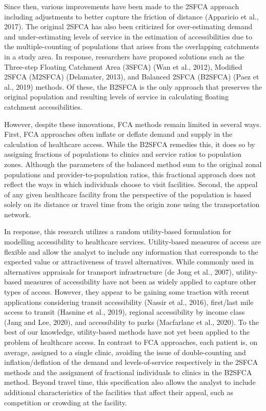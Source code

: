 \documentclass[]{elsarticle} %
\begin{document}
Since then, various improvements have been made to the 2SFCA approach
including adjustments to better capture the friction of distance
(Apparicio et al., 2017). The original 2SFCA has also been criticized
for over-estimating demand and under-estimating levels of service in the
estimation of accessibilities due to the multiple-counting of
populations that arises from the overlapping catchments in a study area.
In response, researchers have proposed solutions such as the Three-step
Floating Catchment Area (3SFCA) (Wan et al., 2012), Modified 2SFCA
(M2SFCA) (Delamater, 2013), and Balanced 2SFCA (B2SFCA) (Paez et al.,
2019) methods. Of these, the B2SFCA is the only approach that preserves
the original population and resulting levels of service in calculating
floating catchment accessibilities.

However, despite these innovations, FCA methods remain limited in
several ways. First, FCA approaches often inflate or deflate demand and
supply in the calculation of healthcare access. While the B2SFCA
remedies this, it does so by assigning fractions of populations to
clinics and service ratios to population zones. Although the parameters
of the balanced method sum to the original zonal populations and
provider-to-population ratios, this fractional approach does not reflect
the ways in which individuals choose to visit facilities. Second, the
appeal of any given healthcare facility from the perspective of the
population is based solely on its distance or travel time from the
origin zone using the transportation network.

In response, this research utilizes a random utility-based formulation
for modelling accessibility to healthcare services. Utility-based
measures of access are flexible and allow the analyst to include any
information that corresponds to the expected value or attractiveness of
travel alternatives. While commonly used in alternatives appraisals for
transport infrastructure (de Jong et al., 2007), utility-based measures
of accessibility have not been as widely applied to capture other types
of access. However, they appear to be gaining some traction with recent
applications considering transit accessibility (Nassir et al., 2016),
first/last mile access to transit (Hasnine et al., 2019), regional
accessibility by income class (Jang and Lee, 2020), and accessibility to
parks (Macfarlane et al., 2020). To the best of our knowledge,
utility-based methods have not yet been applied to the problem of
healthcare access. In contrast to FCA approaches, each patient is, on
average, assigned to a single clinic, avoiding the issue of
double-counting and inflation/deflation of the demand and
levels-of-service respectively in the 2SFCA methods and the assignment
of fractional individuals to clinics in the B2SFCA method. Beyond travel
time, this specification also allows the analyst to include additional
characteristics of the facilities that affect their appeal, such as
competition or crowding at the facility.
\end{document}
